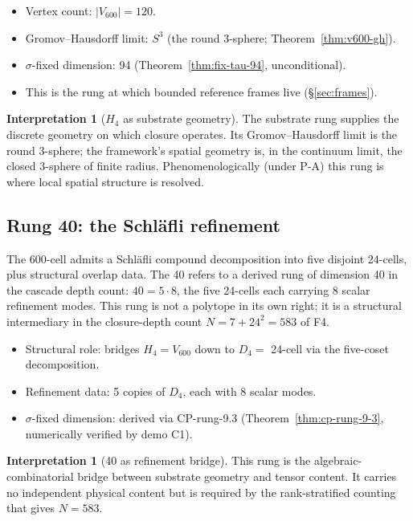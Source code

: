 \documentclass[11pt]{article}
\theoremstyle{plain}
\theoremstyle{definition}
\newtheorem{interpretation}[theorem]{Interpretation}
\theoremstyle{remark}
\begin{document}
\begin{itemize}[leftmargin=2em]
\item Vertex count: $|V_{600}| = 120$.
\item Gromov--Hausdorff limit: $S^3$ (the round 3-sphere; Theorem~\ref{thm:v600-gh}).
\item $\sigma$-fixed dimension: 94 (Theorem~\ref{thm:fix-tau-94}, unconditional).
\item This is the rung at which bounded reference frames live (\S\ref{sec:frames}).
\end{itemize}

\begin{interpretation}[$H_4$ as substrate geometry]\label{int:rung-h4}
The substrate rung supplies the discrete geometry on which closure operates. Its Gromov--Hausdorff limit is the round 3-sphere; the framework's spatial geometry is, in the continuum limit, the closed 3-sphere of finite radius. Phenomenologically (under P-A) this rung is where local spatial structure is resolved.
\end{interpretation}

\subsection{Rung 40: the Schl\"afli refinement}

The 600-cell admits a Schl\"afli compound decomposition into five disjoint 24-cells, plus structural overlap data. The 40 refers to a derived rung of dimension 40 in the cascade depth count: $40 = 5 \cdot 8$, the five 24-cells each carrying 8 scalar refinement modes. This rung is not a polytope in its own right; it is a structural intermediary in the closure-depth count $N = 7 + 24^2 = 583$ of F4.

\begin{itemize}[leftmargin=2em]
\item Structural role: bridges $H_4 = V_{600}$ down to $D_4 = $ 24-cell via the five-coset decomposition.
\item Refinement data: 5 copies of $D_4$, each with 8 scalar modes.
\item $\sigma$-fixed dimension: derived via CP-rung-9.3 (Theorem~\ref{thm:cp-rung-9-3}, numerically verified by demo C1).
\end{itemize}

\begin{interpretation}[40 as refinement bridge]\label{int:rung-40}
This rung is the algebraic-combinatorial bridge between substrate geometry and tensor content. It carries no independent physical content but is required by the rank-stratified counting that gives $N = 583$.
\end{interpretation}
\end{document}

